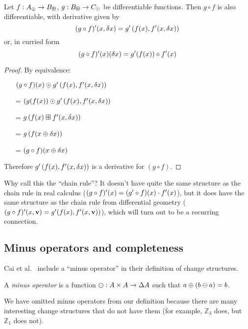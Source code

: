 \begin{thm}
  Let $f: A_\oplus \rightarrow B_\boxplus$, $g: B_\boxplus \rightarrow C_\odot$ be differentiable functions. Then $g \circ f$ is also
  differentiable, with derivative given by
   $$(g \circ f)'(x, \delta x) = g'\left(f(x), f'(x, \delta x)\right)$$
   or, in curried form
   $$(g \circ f)'(x)(\delta x) = g'(f(x)) \circ f'(x)$$
\end{thm}
\begin{proof}
  By equivalence:
  \begin{itemize}
    \item[ ]$(g \circ f)(x) \odot g'\left(f(x), f'(x,\delta x)\right)$
    \item[=]$(g(f(x)) \odot g'\left(f(x), f'(x,\delta x)\right)$
    \item[=]$g\left(f(x) \boxplus f'(x, \delta x) \right)$
    \item[=]$g\left(f(x \oplus \delta x)\right)$
    \item[=]$(g \circ f)(x \oplus \delta x)$
  \end{itemize}
  Therefore $g'\left(f(x), f'(x, \delta x)\right)$ is a
  derivative for $(g \circ f)$.
\end{proof}

Why call this the ``chain rule''? It doesn't have quite the same structure as
the chain rule in real calculus ($(g \circ f)'(x) = (g' \circ f)
(x) \cdot f'(x)$), but it does have the same structure as the chain rule
from differential geometry ($(g \circ f)'(x, \textbf{v}) = g'
(f(x), f'(x, \textbf{v}))$), which will turn out to be a recurring
connection. 

\subsection{Minus operators and completeness}

Cai et al.~\cite{cai2014changes} include a ``minus operator'' in their definition of change structures. 

\begin{defn}
  A \textit{minus operator} is a function $\ominus: A \times A \rightarrow \Delta A$ such that $a \oplus (b \ominus a) = b$.
\end{defn}

We have omitted minus operators from our definition because
there are many interesting change structures that do not have them (for example,
$\mathbb{Z}_3$ does, but $\mathbb{Z}_1$ does not).

